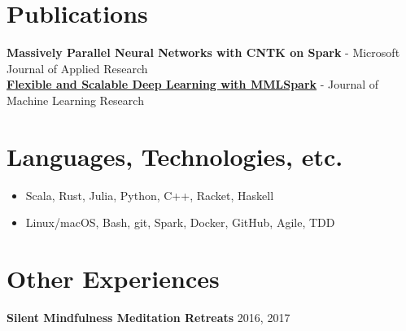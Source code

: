 \documentclass[overlapped]{res}
\begin{document}
\begin{resume}


    \section{Publications}
        {\bf Massively Parallel Neural Networks with CNTK on Spark} - Microsoft Journal of Applied Research \\
        {\bf \href{https://arxiv.org/pdf/1804.04031.pdf}{\underline{Flexible and Scalable Deep Learning with MMLSpark}}} - Journal of Machine Learning Research

    \section{Languages, Technologies, etc.}
    \begin{itemize} \itemsep-2pt
        \item
            Scala, Rust, Julia, Python, C++, Racket, Haskell
        \item
            Linux/macOS, Bash, git, Spark, Docker, GitHub, Agile, TDD
    \end{itemize}

    \section{Other Experiences}

    {\bf Silent Mindfulness Meditation Retreats} \hfill 2016, 2017

\end{resume}
\end{document}
